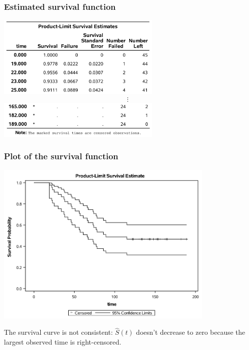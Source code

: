 \documentclass{beamer}
\begin{document}
\begin{frame}
\frametitle{Estimated survival function}
\begin{center}
\includegraphics[width = 0.6\textwidth]{img/c7/slides7e03}
\begin{align*}
 \vdots
\end{align*}
\includegraphics[width = 0.6\textwidth]{img/c7/slides7e04}
\end{center}
\end{frame}

\begin{frame}
\frametitle{Plot of the survival function}
\begin{center}
\includegraphics[width = 0.8\textwidth]{img/c7/slides7e05}
\end{center}
{ \footnotesize 

The survival curve is not consistent: $\widehat{S}(t)$ doesn't decrease to zero because the largest observed time is right-censored.


}
\end{frame}
% 
% 
\end{document}
